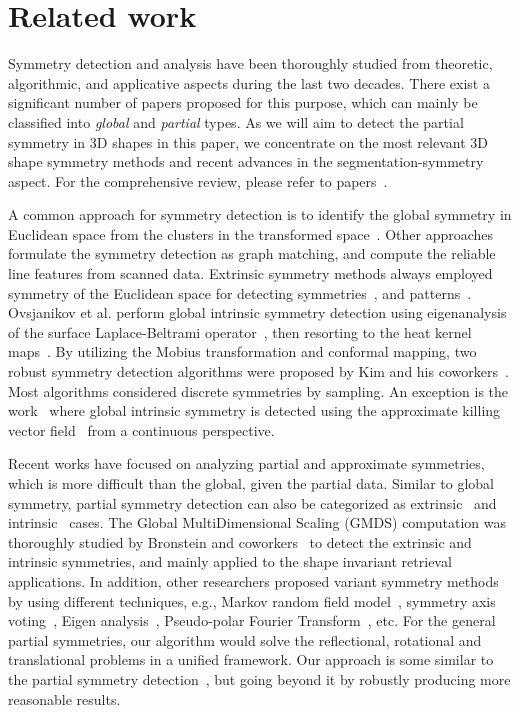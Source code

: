 \section{Related work}
\label{sec:related}

Symmetry detection and analysis have been thoroughly studied from theoretic, algorithmic, and applicative aspects during the last two decades.
There exist a significant number of papers proposed for this purpose, which can mainly be classified into \emph{global} and \emph{partial} types.
As we will aim to detect the partial symmetry in 3D shapes in this paper, we concentrate on the most relevant 3D shape symmetry methods and recent advances in the segmentation-symmetry aspect.
For the comprehensive review, please refer to papers~\cite{xu2009,berner2011}.

A common approach for symmetry detection is to identify the global symmetry in Euclidean space from the clusters in the transformed space~\cite{podolak2006,pauly2008}. 
Other approaches~\cite{Berner2008,bokeloh2009} formulate the symmetry detection as graph matching, and compute the reliable line features from scanned data.
Extrinsic symmetry methods always employed symmetry of the Euclidean space for detecting symmetries~\cite{zabrodsky1997,podolak2006,ovsjanikov2008,ovsjanikov2010,chertok2010,hooda2011},
and patterns~\cite{pauly2008,bokeloh2009,yeh2009}.
Ovsjanikov et al. perform global intrinsic symmetry detection using eigenanalysis of the surface Laplace-Beltrami operator~\cite{ovsjanikov2008}, 
then resorting to the heat kernel maps~\cite{ovsjanikov2010}.
By utilizing the Mobius transformation and conformal mapping, two robust symmetry detection algorithms were proposed by Kim and his coworkers~\cite{kim2010,kim2011}.
Most algorithms considered discrete symmetries by sampling. An exception is the work~\cite{ben-chen2010}
where global intrinsic symmetry is detected using the approximate killing vector field~\cite{ben-chen2010} from a continuous perspective.

Recent works have focused on analyzing partial and approximate symmetries, which is more difficult than the global, given the partial data.
Similar to global symmetry, partial symmetry detection can also be categorized as extrinsic~\cite{mitra2006,bronstein2009,berner2011} and intrinsic~\cite{lasowski2009,xu2009,mitra2010,raviv2010,bronstein2011} cases.
The Global MultiDimensional Scaling (GMDS) computation was thoroughly studied by Bronstein and coworkers~\cite{bronstein2006,bronstein2009,raviv2010,bronstein2011} to detect the extrinsic and intrinsic symmetries, and mainly applied to the shape invariant retrieval applications. In addition, other researchers proposed variant symmetry methods by using different techniques, e.g., Markov random field model~\cite{lasowski2009}, symmetry axis voting~\cite{xu2009}, Eigen analysis~\cite{lipman2010}, Pseudo-polar Fourier Transform~\cite{bermanis2010}, etc.
For the general partial symmetries, our algorithm would solve the reflectional, rotational and translational problems in a unified framework. Our approach is some similar to the partial symmetry detection~\cite{berner2011}, but going beyond it by robustly producing more reasonable results.


